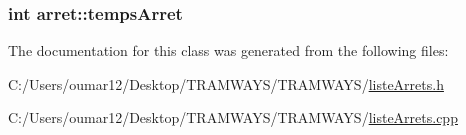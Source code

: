 \subsubsection[{\texorpdfstring{temps\+Arret}{tempsArret}}]{\setlength{\rightskip}{0pt plus 5cm}int arret\+::temps\+Arret}\hypertarget{classarret_afc7a6e7cb0cb73e242a4c6ad8743995c}{}\label{classarret_afc7a6e7cb0cb73e242a4c6ad8743995c}


The documentation for this class was generated from the following files\+:\begin{DoxyCompactItemize}
\item 
C\+:/\+Users/oumar12/\+Desktop/\+T\+R\+A\+M\+W\+A\+Y\+S/\+T\+R\+A\+M\+W\+A\+Y\+S/\hyperlink{liste_arrets_8h}{liste\+Arrets.\+h}\item 
C\+:/\+Users/oumar12/\+Desktop/\+T\+R\+A\+M\+W\+A\+Y\+S/\+T\+R\+A\+M\+W\+A\+Y\+S/\hyperlink{liste_arrets_8cpp}{liste\+Arrets.\+cpp}\end{DoxyCompactItemize}
